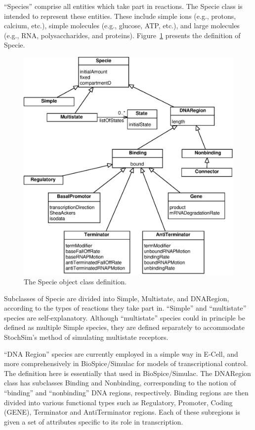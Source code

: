 \documentclass[10pt]{article}
\newcommand{\class}[1]{\textsf{#1}}
\begin{document}
``Species'' comprise all entities which take part in reactions.  The
\class{Specie} class is intended to represent these entities.  These
include simple ions (e.g., protons, calcium, etc.), simple molecules (e.g.,
glucose, ATP, etc.), and large molecules (e.g., RNA, polysaccharides, and
proteins).  Figure~\ref{fig:specie} presents the definition of
\class{Specie}.

\begin{figure}
  \centering
  \includegraphics[scale = 0.75]{specie.eps}
  \caption{The \class{Specie} object class definition.}
  \label{fig:specie}
\end{figure}

Subclasses of \class{Specie} are divided into \class{Simple},
\class{Multistate}, and \class{DNARegion}, according to the types of
reactions they take part in.  ``Simple'' and ``multistate'' species are
self-explanatory.  Although ``multistate'' species could in principle be
defined as multiple \class{Simple} species, they are defined separately to
accommodate StochSim's method of simulating multistate receptors.

``DNA Region'' species are currently employed in a simple way in E-Cell,
and more comprehensively in BioSpice/Simulac for models of transcriptional
control.  The definition here is essentially that used in BioSpice/Simulac.
The \class{DNARegion} class has subclasses \class{Binding} and
\class{Nonbinding}, corresponding to the notion of ``binding'' and
``nonbinding'' DNA regions, respectively.  Binding regions are then divided
into various functional types such as \class{Regulatory}, \class{Promoter},
\class{Coding} (GENE), \class{Terminator} and \class{AntiTerminator}
regions.  Each of these subregions is given a set of attributes specific to
its role in transcription.
\end{document}
